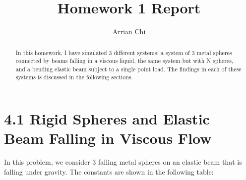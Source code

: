 \documentclass[letterpaper, 10 pt, conference]{ieeeconf}  %
\title{\LARGE \bf
Homework 1 Report
}
\author{Arrian Chi%
}
\begin{document}
\maketitle
\thispagestyle{empty}
\pagestyle{empty}


\begin{abstract}

In this homework, I have simulated 3 different systems: a system of 3 metal spheres connected by beams falling in a viscous liquid, the same system but with N spheres, and a bending elastic beam subject to a single point load. The findings in each of these systems is discussed in the following sections.

\end{abstract}


\section{4.1 Rigid Spheres and Elastic Beam Falling in Viscous Flow}

In this problem, we consider 3 falling metal spheres on an elastic beam that is falling under gravity. The constants are shown in the following table:
\end{document}
